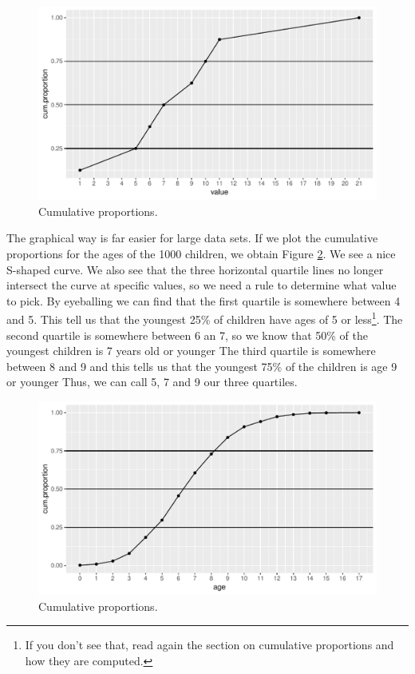 \documentclass[]{report}\usepackage[]{graphicx}\usepackage[]{color}
\makeatletter
\def\maxwidth{ %
  \ifdim\Gin@nat@width>\linewidth
    \linewidth
  \else
    \Gin@nat@width
  \fi
}
\makeatother
\begin{document}
\begin{figure}

{\centering \includegraphics[width=\maxwidth]{figure/quartile_1-1} 

}

\caption[Cumulative proportions]{Cumulative proportions.}\label{fig:quartile_1}
\end{figure}



The graphical way is far easier for large data sets. If we plot the cumulative proportions for the ages of the 1000 children, we obtain Figure \ref{fig:quartile_2}. We see a nice S-shaped curve. We also see that the three horizontal quartile lines no longer intersect the curve at specific values, so we need a rule to determine what value to pick. By eyeballing we can find that the first quartile is somewhere between 4 and 5. This tell us that the youngest 25\% of children have ages of 5 or less\footnote{If you don't see that, read again the section on cumulative proportions and how they are computed.}. The second quartile is somewhere between 6 an 7, so we know that 50\% of the youngest children is 7 years old or younger The third quartile is somewhere between 8 and 9 and this tells us that the youngest 75\% of the children is age 9 or younger Thus, we can call 5, 7 and 9 our three quartiles.



\begin{figure}

{\centering \includegraphics[width=\maxwidth]{figure/quartile_2-1} 

}

\caption[Cumulative proportions]{Cumulative proportions.}\label{fig:quartile_2}
\end{figure}
\end{document}
